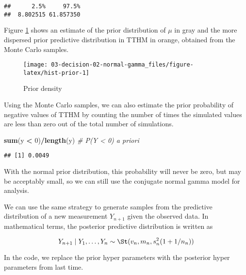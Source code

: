 \documentclass[]{book}
\newenvironment{Shaded}{\begin{snugshade}}{\end{snugshade}}
\newcommand{\KeywordTok}[1]{\textcolor[rgb]{0.13,0.29,0.53}{\textbf{#1}}}
\newcommand{\DecValTok}[1]{\textcolor[rgb]{0.00,0.00,0.81}{#1}}
\newcommand{\StringTok}[1]{\textcolor[rgb]{0.31,0.60,0.02}{#1}}
\newcommand{\CommentTok}[1]{\textcolor[rgb]{0.56,0.35,0.01}{\textit{#1}}}
\newcommand{\OperatorTok}[1]{\textcolor[rgb]{0.81,0.36,0.00}{\textbf{#1}}}
\newcommand{\NormalTok}[1]{#1}
\theoremstyle{definition}
\theoremstyle{definition}
\theoremstyle{definition}
\theoremstyle{remark}
\begin{document}
\begin{verbatim}
##      2.5%     97.5% 
##  8.802515 61.857350
\end{verbatim}

Figure \ref{fig:hist-prior} shows an estimate of the prior distribution
of \(\mu\) in gray and the more dispersed prior predictive distribution
in TTHM in orange, obtained from the Monte Carlo samples.

\begin{figure}

{\centering \texttt{[image: 03-decision-02-normal-gamma\_files/figure-latex/hist-prior-1]} 

}

\caption{Prior density}\label{fig:hist-prior}
\end{figure}

Using the Monte Carlo samples, we can also estimate the prior
probability of negative values of TTHM by counting the number of times
the simulated values are less than zero out of the total number of
simulations.

\begin{Shaded}
\begin{Highlighting}[]
\KeywordTok{sum}\NormalTok{(y }\OperatorTok{<}\StringTok{ }\DecValTok{0}\NormalTok{)}\OperatorTok{/}\KeywordTok{length}\NormalTok{(y)  }\CommentTok{# P(Y < 0) a priori}
\end{Highlighting}
\end{Shaded}

\begin{verbatim}
## [1] 0.0049
\end{verbatim}

With the normal prior distribution, this probability will never be zero,
but may be acceptably small, so we can still use the conjugate normal
gamma model for analysis.

We can use the same strategy to generate samples from the predictive
distribution of a new measurement \(Y_{n+1}\) given the observed data.
In mathematical terms, the posterior predictive distribution is written
as

\[Y_{n+1} \mid Y_1, \ldots, Y_n \sim \St(v_n, m_n, s^2_n (1 + 1/n_n))\]

In the code, we replace the prior hyper parameters with the posterior
hyper parameters from last time.
\end{document}
